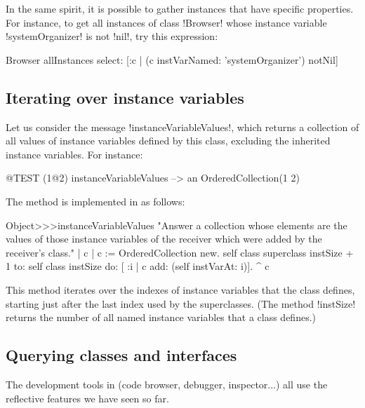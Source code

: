 \documentclass[a4paper,10pt,twoside]{book}
\begin{document}
In the same spirit, it is possible to gather instances that have specific properties.
For instance, to get all instances of class \ct!Browser! whose instance variable \ct!systemOrganizer! is not \ct!nil!, try this expression:
\begin{code}{}
Browser allInstances select: [:c | (c instVarNamed: 'systemOrganizer') notNil]
\end{code}

\subsection{Iterating over instance variables}

Let us consider the message \ct!instanceVariableValues!, which returns a collection of all values of instance variables defined by this class, excluding the inherited instance variables.
For instance:
\begin{code}{@TEST}
(1@2) instanceVariableValues --> an OrderedCollection(1 2)
\end{code}

The method is implemented in  as follows:
\begin{code}{}
Object>>>instanceVariableValues
	"Answer a collection whose elements are the values of those instance variables of the receiver which were added by the receiver's class."	
	| c |
	c := OrderedCollection new.
	self class superclass instSize + 1
		to: self class instSize
		do: [ :i | c add: (self instVarAt: i)].
	^ c
\end{code}

This method iterates over the indexes of instance variables that the class defines, starting just after the last index used by the superclasses.
(The method \ct!instSize! returns the number of all named instance variables that a class defines.)

\subsection{Querying classes and interfaces}

The development tools in \squeak (code browser, debugger, inspector...) all use the reflective features we have seen so far.
\end{document}
